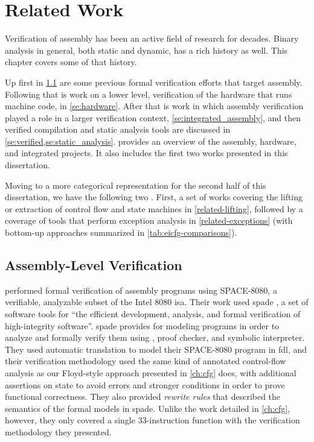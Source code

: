 \chapter{Related Work}\label{ch:related}
Verification of assembly has been an active field of research for decades.
Binary analysis in general, both static and dynamic, has a rich history as well.
This chapter covers some of that history.

Up first in \cref{se:previous_assembly}
are some previous formal verification efforts that target assembly.
Following that is work on a lower level,
verification of the hardware that runs machine code, in \cref{se:hardware}.
After that is work in which assembly verification played a role
in a larger verification context, \cref{se:integrated_assembly},
and then verified compilation and static analysis tools are discussed
in \cref{se:verified,se:static_analysis}.
 provides an overview of the assembly,
hardware, and integrated projects.
It also includes the first two works presented in this dissertation.

Moving to a more categorical representation for the second half of this dissertation, we have the following two .
First, a set of works covering the lifting or extraction of control flow and state machines in \cref{related-lifting}, followed by a coverage of tools that perform exception analysis in \cref{related-exceptions} (with bottom-up approaches summarized in \cref{tab:eicfg-comparisons}).

\section{Assembly-Level Verification}\label{se:previous_assembly}
\Textcite{clutterbuck1986validation,clutterbuck1988verification} performed formal verification
of assembly programs using SPACE-8080, a verifiable,
analyzable subset of the Intel 8080 \ac{isa}.
Their work used \ac{spade} \autocite{carre1986spade}, a set of software tools for ``the efficient development, analysis, and formal verification of high-integrity software''.
\Ac{spade} provides  for modeling programs
in order to analyze and formally verify them
using , proof checker, and symbolic interpreter.
They used automatic translation to model their SPACE-8080 program
in \ac{fdl}, and their verification methodology used the same kind of
annotated control-flow analysis as our Floyd-style approach
presented in \cref{ch:cfg} does, with additional assertions on state to avoid errors
and stronger conditions in order to prove functional correctness.
They also provided \emph{rewrite rules} that described the semantics
of the formal models in \ac{spade}. Unlike the work detailed in \cref{ch:cfg}, however,
they only covered a single 33-instruction function
with the verification methodology they presented.

